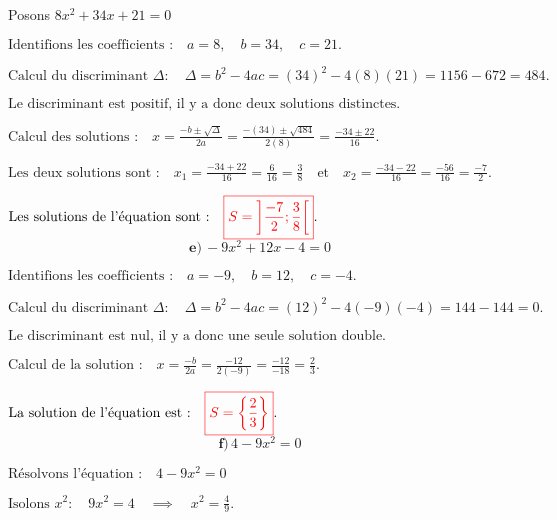 \documentclass[12pt,a4paper]{article}
\begin{document}
Posons \( 8x^2 + 34x + 21 = 0 \)

\(
\text{Identifions les coefficients :} \quad a = 8, \quad b = 34, \quad c = 21.
\)

\(
\text{Calcul du discriminant } \Delta : \quad
\Delta = b^2 - 4ac = (34)^2 - 4(8)(21) = 1156 - 672  = 484.
\)

\(
\text{Le discriminant est positif, il y a donc deux solutions distinctes.}
\)

\(
\text{Calcul des solutions :} \quad
x = \frac{-b \pm \sqrt{\Delta}}{2a} = \frac{-(34) \pm \sqrt{484}}{2(8)} = \frac{-34 \pm 22}{16}.
\)

\(
\text{Les deux solutions sont :} \quad
x_1 = \frac{-34 + 22}{16} = \frac{6}{16} = \frac{3}{8} \quad \text{et} \quad x_2 = \frac{-34 - 22}{16} = \frac{-56}{16} = \frac{-7}{2}.
\)


\(
\text{Les solutions de l'équation sont :} \quad
\textcolor{red}{\boxed{S=\left]\frac{-7}{2};\frac{3}{8} \right[ }}.
\)
\\

\[ \textbf{e)} \, -9x^2 + 12x - 4 = 0 \]

\(
\text{Identifions les coefficients :} \quad a = -9, \quad b = 12, \quad c = -4.
\)

\(
\text{Calcul du discriminant } \Delta : \quad
\Delta = b^2 - 4ac = (12)^2 - 4(-9)(-4) = 144 - 144 = 0.
\)

\(
\text{Le discriminant est nul, il y a donc une seule solution double.}
\)

\(
\text{Calcul de la solution :} \quad
x = \frac{-b}{2a} = \frac{-12}{2(-9)} = \frac{-12}{-18} = \frac{2}{3}.
\)

\(
\text{La solution de l'équation est :} \quad
\textcolor{red}{\boxed{S=\left\lbrace  \frac{2}{3} \right\rbrace }}.
\)\\

\[ \textbf{f)} \, 4 - 9x^2 = 0 \]

\( \text{Résolvons l'équation :} \quad 4 - 9x^2 = 0 \)

\(
\text{Isolons } x^2 : \quad 9x^2 = 4 \quad \implies \quad x^2 = \frac{4}{9}.
\)
\end{document}
